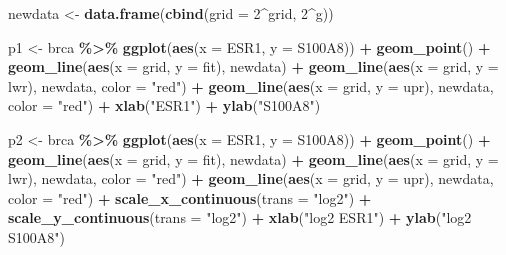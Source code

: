 \documentclass[
  12pt,dutch,coursenotes]{book}
\newenvironment{Shaded}{\begin{snugshade}}{\end{snugshade}}
\newcommand{\DataTypeTok}[1]{\textcolor[rgb]{0.13,0.29,0.53}{#1}}
\newcommand{\DecValTok}[1]{\textcolor[rgb]{0.00,0.00,0.81}{#1}}
\newcommand{\KeywordTok}[1]{\textcolor[rgb]{0.13,0.29,0.53}{\textbf{#1}}}
\newcommand{\NormalTok}[1]{#1}
\newcommand{\OperatorTok}[1]{\textcolor[rgb]{0.81,0.36,0.00}{\textbf{#1}}}
\newcommand{\StringTok}[1]{\textcolor[rgb]{0.31,0.60,0.02}{#1}}
\theoremstyle{definition}
\theoremstyle{definition}
\theoremstyle{definition}
\theoremstyle{remark}
\begin{document}
\begin{Shaded}
\begin{Highlighting}[]
\NormalTok{newdata \textless{}{-}}\StringTok{ }\KeywordTok{data.frame}\NormalTok{(}\KeywordTok{cbind}\NormalTok{(}\DataTypeTok{grid =} \DecValTok{2}\OperatorTok{\^{}}\NormalTok{grid, }\DecValTok{2}\OperatorTok{\^{}}\NormalTok{g))}

\NormalTok{p1 \textless{}{-}}\StringTok{ }\NormalTok{brca }\OperatorTok{\%\textgreater{}\%}\StringTok{ }\KeywordTok{ggplot}\NormalTok{(}\KeywordTok{aes}\NormalTok{(}\DataTypeTok{x =}\NormalTok{ ESR1, }\DataTypeTok{y =}\NormalTok{ S100A8)) }\OperatorTok{+}\StringTok{ }
\StringTok{    }\KeywordTok{geom\_point}\NormalTok{() }\OperatorTok{+}\StringTok{ }\KeywordTok{geom\_line}\NormalTok{(}\KeywordTok{aes}\NormalTok{(}\DataTypeTok{x =}\NormalTok{ grid, }\DataTypeTok{y =}\NormalTok{ fit), }
\NormalTok{    newdata) }\OperatorTok{+}\StringTok{ }\KeywordTok{geom\_line}\NormalTok{(}\KeywordTok{aes}\NormalTok{(}\DataTypeTok{x =}\NormalTok{ grid, }\DataTypeTok{y =}\NormalTok{ lwr), newdata, }
    \DataTypeTok{color =} \StringTok{"red"}\NormalTok{) }\OperatorTok{+}\StringTok{ }\KeywordTok{geom\_line}\NormalTok{(}\KeywordTok{aes}\NormalTok{(}\DataTypeTok{x =}\NormalTok{ grid, }\DataTypeTok{y =}\NormalTok{ upr), }
\NormalTok{    newdata, }\DataTypeTok{color =} \StringTok{"red"}\NormalTok{) }\OperatorTok{+}\StringTok{ }\KeywordTok{xlab}\NormalTok{(}\StringTok{"ESR1"}\NormalTok{) }\OperatorTok{+}\StringTok{ }\KeywordTok{ylab}\NormalTok{(}\StringTok{"S100A8"}\NormalTok{)}

\NormalTok{p2 \textless{}{-}}\StringTok{ }\NormalTok{brca }\OperatorTok{\%\textgreater{}\%}\StringTok{ }\KeywordTok{ggplot}\NormalTok{(}\KeywordTok{aes}\NormalTok{(}\DataTypeTok{x =}\NormalTok{ ESR1, }\DataTypeTok{y =}\NormalTok{ S100A8)) }\OperatorTok{+}\StringTok{ }
\StringTok{    }\KeywordTok{geom\_point}\NormalTok{() }\OperatorTok{+}\StringTok{ }\KeywordTok{geom\_line}\NormalTok{(}\KeywordTok{aes}\NormalTok{(}\DataTypeTok{x =}\NormalTok{ grid, }\DataTypeTok{y =}\NormalTok{ fit), }
\NormalTok{    newdata) }\OperatorTok{+}\StringTok{ }\KeywordTok{geom\_line}\NormalTok{(}\KeywordTok{aes}\NormalTok{(}\DataTypeTok{x =}\NormalTok{ grid, }\DataTypeTok{y =}\NormalTok{ lwr), newdata, }
    \DataTypeTok{color =} \StringTok{"red"}\NormalTok{) }\OperatorTok{+}\StringTok{ }\KeywordTok{geom\_line}\NormalTok{(}\KeywordTok{aes}\NormalTok{(}\DataTypeTok{x =}\NormalTok{ grid, }\DataTypeTok{y =}\NormalTok{ upr), }
\NormalTok{    newdata, }\DataTypeTok{color =} \StringTok{"red"}\NormalTok{) }\OperatorTok{+}\StringTok{ }\KeywordTok{scale\_x\_continuous}\NormalTok{(}\DataTypeTok{trans =} \StringTok{"log2"}\NormalTok{) }\OperatorTok{+}\StringTok{ }
\StringTok{    }\KeywordTok{scale\_y\_continuous}\NormalTok{(}\DataTypeTok{trans =} \StringTok{"log2"}\NormalTok{) }\OperatorTok{+}\StringTok{ }\KeywordTok{xlab}\NormalTok{(}\StringTok{"log2 ESR1"}\NormalTok{) }\OperatorTok{+}\StringTok{ }
\StringTok{    }\KeywordTok{ylab}\NormalTok{(}\StringTok{"log2 S100A8"}\NormalTok{)}


\end{Highlighting}
\end{Shaded}
\end{document}
